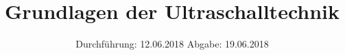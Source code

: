

\subject{Versuch US1}
\title{Grundlagen der Ultraschalltechnik}
\date{%
  Durchführung: 12.06.2018
  \hspace{3em}
  Abgabe: 19.06.2018
}



\maketitle
\thispagestyle{empty}
\tableofcontents
\newpage






\printbibliography{}


